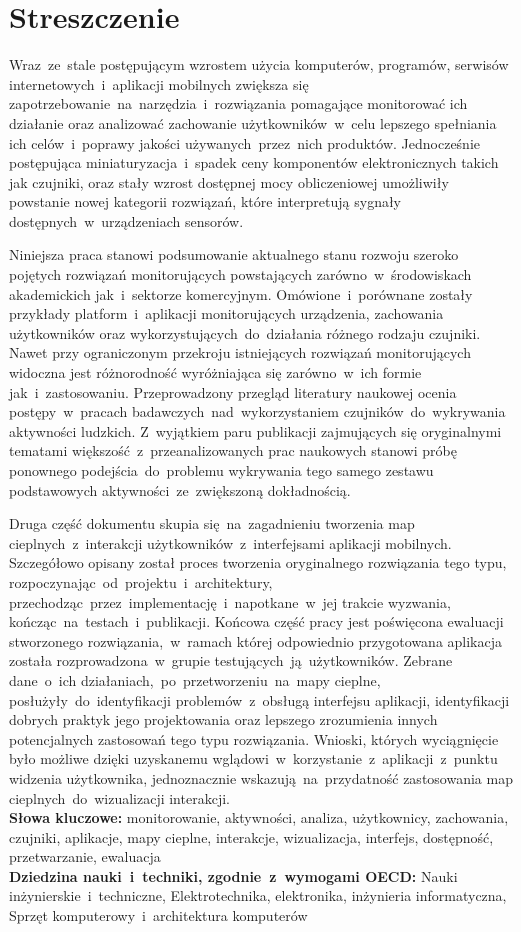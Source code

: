\chapter*{Streszczenie}
Wraz~ze~stale postępującym wzrostem użycia komputerów, programów, serwisów internetowych~i~aplikacji mobilnych zwiększa się zapotrzebowanie~na~narzędzia~i~rozwiązania pomagające monitorować ich działanie oraz analizować zachowanie użytkowników~w~celu lepszego spełniania ich celów~i~poprawy jakości używanych~przez~nich produktów. Jednocześnie postępująca miniaturyzacja~i~spadek ceny komponentów elektronicznych takich jak czujniki, oraz stały wzrost dostępnej mocy obliczeniowej umożliwiły powstanie nowej kategorii rozwiązań, które interpretują sygnały dostępnych~w~urządzeniach sensorów. 

Niniejsza praca stanowi podsumowanie aktualnego stanu rozwoju szeroko pojętych rozwiązań monitorujących powstających zarówno~w~środowiskach akademickich jak~i~sektorze komercyjnym. Omówione~i~porównane zostały przykłady platform~i~aplikacji monitorujących urządzenia, zachowania użytkowników oraz wykorzystujących~do~działania różnego rodzaju czujniki. Nawet przy ograniczonym przekroju istniejących rozwiązań monitorujących widoczna jest różnorodność wyróżniająca się zarówno~w~ich formie jak~i~zastosowaniu. Przeprowadzony przegląd literatury naukowej ocenia postępy~w~pracach badawczych~nad~wykorzystaniem czujników~do~wykrywania aktywności ludzkich. Z~wyjątkiem paru publikacji zajmujących się oryginalnymi tematami większość~z~przeanalizowanych prac naukowych stanowi próbę ponownego podejścia~do~problemu wykrywania tego samego zestawu podstawowych aktywności~ze~zwiększoną dokładnością. 

Druga część dokumentu skupia się~na~zagadnieniu tworzenia map cieplnych~z~interakcji użytkowników~z~interfejsami aplikacji mobilnych. Szczegółowo opisany został proces tworzenia oryginalnego rozwiązania tego typu, rozpoczynając~od~projektu~i~architektury, przechodząc~przez~implementację~i~napotkane~w~jej trakcie wyzwania, kończąc~na~testach~i~publikacji. Końcowa część pracy jest poświęcona ewaluacji stworzonego rozwiązania,~w~ramach której odpowiednio przygotowana aplikacja została rozprowadzona~w~grupie testujących~ją~użytkowników. Zebrane dane~o~ich działaniach,~po~przetworzeniu~na~mapy cieplne, posłużyły~do~identyfikacji problemów~z~obsługą interfejsu aplikacji, identyfikacji dobrych praktyk jego projektowania oraz lepszego zrozumienia innych potencjalnych zastosowań tego typu rozwiązania. Wnioski, których wyciągnięcie było możliwe dzięki uzyskanemu wglądowi~w~korzystanie~z~aplikacji~z~punktu widzenia użytkownika, jednoznacznie wskazują~na~przydatność zastosowania map cieplnych~do~wizualizacji interakcji. \\

\noindent\textbf{Słowa kluczowe:} monitorowanie, aktywności, analiza, użytkownicy, zachowania, czujniki, aplikacje, mapy cieplne, interakcje, wizualizacja, interfejs, dostępność, przetwarzanie, ewaluacja \\

\noindent\textbf{Dziedzina nauki~i~techniki, zgodnie~z~wymogami OECD:} Nauki inżynierskie~i~techniczne, Elektrotechnika, elektronika, inżynieria informatyczna, Sprzęt komputerowy~i~architektura komputerów

